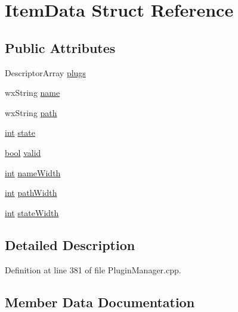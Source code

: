 \hypertarget{struct_item_data}{}\section{Item\+Data Struct Reference}
\label{struct_item_data}
\subsection*{Public Attributes}
\begin{DoxyCompactItemize}
\item 
Descriptor\+Array \hyperlink{struct_item_data_af6455fda366e14e56a32fa29740ed993}{plugs}
\item 
wx\+String \hyperlink{struct_item_data_a2606dd42bcb9cf78f5cb8b469d295f2b}{name}
\item 
wx\+String \hyperlink{struct_item_data_a23074d8b0bcba5a6f8c156aaaec8c914}{path}
\item 
\hyperlink{xmltok_8h_a5a0d4a5641ce434f1d23533f2b2e6653}{int} \hyperlink{struct_item_data_aeba3a1cbadc777d743f820b7c1d98905}{state}
\item 
\hyperlink{mac_2config_2i386_2lib-src_2libsoxr_2soxr-config_8h_abb452686968e48b67397da5f97445f5b}{bool} \hyperlink{struct_item_data_afcd2975b9c223498a200b25fdf772868}{valid}
\item 
\hyperlink{xmltok_8h_a5a0d4a5641ce434f1d23533f2b2e6653}{int} \hyperlink{struct_item_data_a941d57ae5e22297c9dd27f199c33b4fc}{name\+Width}
\item 
\hyperlink{xmltok_8h_a5a0d4a5641ce434f1d23533f2b2e6653}{int} \hyperlink{struct_item_data_a30c61ff015ef3f762645063d9db149b5}{path\+Width}
\item 
\hyperlink{xmltok_8h_a5a0d4a5641ce434f1d23533f2b2e6653}{int} \hyperlink{struct_item_data_a7ae753decf5c72933e702b4f00bc05d8}{state\+Width}
\end{DoxyCompactItemize}


\subsection{Detailed Description}


Definition at line 381 of file Plugin\+Manager.\+cpp.



\subsection{Member Data Documentation}
